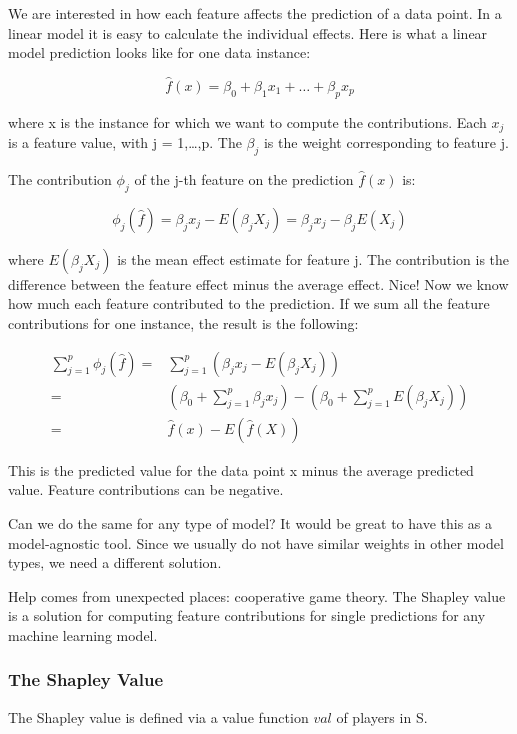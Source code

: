 \documentclass[
  11pt,
]{scrbook}
\begin{document}
We are interested in how each feature affects the prediction of a data point.
In a linear model it is easy to calculate the individual effects.
Here is what a linear model prediction looks like for one data instance:

\[\hat{f}(x)=\beta_0+\beta_{1}x_{1}+\ldots+\beta_{p}x_{p}\]

where x is the instance for which we want to compute the contributions.
Each \(x_j\) is a feature value, with j = 1,\ldots,p.
The \(\beta_j\) is the weight corresponding to feature j.

The contribution \(\phi_j\) of the j-th feature on the prediction \(\hat{f}(x)\) is:

\[\phi_j(\hat{f})=\beta_{j}x_j-E(\beta_{j}X_{j})=\beta_{j}x_j-\beta_{j}E(X_{j})\]

where \(E(\beta_jX_{j})\) is the mean effect estimate for feature j.
The contribution is the difference between the feature effect minus the average effect.
Nice!
Now we know how much each feature contributed to the prediction.
If we sum all the feature contributions for one instance, the result is the following:

\begin{align*}\sum_{j=1}^{p}\phi_j(\hat{f})=&\sum_{j=1}^p(\beta_{j}x_j-E(\beta_{j}X_{j}))\\=&(\beta_0+\sum_{j=1}^p\beta_{j}x_j)-(\beta_0+\sum_{j=1}^{p}E(\beta_{j}X_{j}))\\=&\hat{f}(x)-E(\hat{f}(X))\end{align*}

This is the predicted value for the data point x minus the average predicted value.
Feature contributions can be negative.

Can we do the same for any type of model?
It would be great to have this as a model-agnostic tool.
Since we usually do not have similar weights in other model types, we need a different solution.

Help comes from unexpected places: cooperative game theory.
The Shapley value is a solution for computing feature contributions for single predictions for any machine learning model.

\hypertarget{the-shapley-value}{%
\subsubsection{The Shapley Value}\label{the-shapley-value}}

The Shapley value is defined via a value function \(val\) of players in S.
\end{document}
